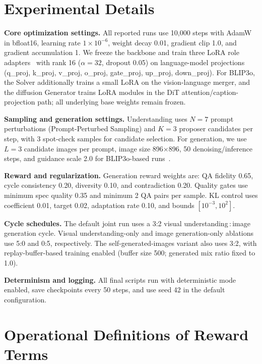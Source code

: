 \documentclass[runningheads]{llncs}
\begin{document}
\section{Experimental Details}
\label{sec:sup_implementation}

\noindent\textbf{Core optimization settings.}
All reported runs use 10{,}000 steps with AdamW in bfloat16, learning rate $1\times10^{-6}$, weight decay 0.01, gradient clip 1.0, and gradient accumulation 1. We freeze the backbone and train three LoRA role adapters~\cite{hu2022lora} with rank 16 ($\alpha=32$, dropout 0.05) on language-model projections (q\_proj, k\_proj, v\_proj, o\_proj, gate\_proj, up\_proj, down\_proj). For BLIP3o, the Solver additionally trains a small LoRA on the vision-language merger, and the diffusion Generator trains LoRA modules in the DiT attention/caption-projection path; all underlying base weights remain frozen.

\noindent\textbf{Sampling and generation settings.}
Understanding uses $N=7$ prompt perturbations (Prompt-Perturbed Sampling) and $K=3$ proposer candidates per step, with 3 spot-check samples for candidate selection. For generation, we use $L=3$ candidate images per prompt, image size 896$\times$896, 50 denoising/inference steps, and guidance scale 2.0 for BLIP3o-based runs~\cite{chen2025blip3o}.

\noindent\textbf{Reward and regularization.}
Generation reward weights are: QA fidelity 0.65, cycle consistency 0.20, diversity 0.10, and contradiction 0.20. Quality gates use minimum spec quality 0.35 and minimum 2 QA pairs per sample. KL control uses coefficient 0.01, target 0.02, adaptation rate 0.10, and bounds $[10^{-3},10^2]$.

\noindent\textbf{Cycle schedules.}
The default joint run uses a 3:2 visual understanding\,:\,image generation cycle. Visual understanding-only and image generation-only ablations use 5:0 and 0:5, respectively. The self-generated-images variant also uses 3:2, with replay-buffer-based training enabled (buffer size 500; generated mix ratio fixed to 1.0).

\noindent\textbf{Determinism and logging.}
All final scripts run with deterministic mode enabled, save checkpoints every 50 steps, and use seed 42 in the default configuration.

\section{Operational Definitions of Reward Terms}
\label{sec:sup_reward_terms}
\end{document}
